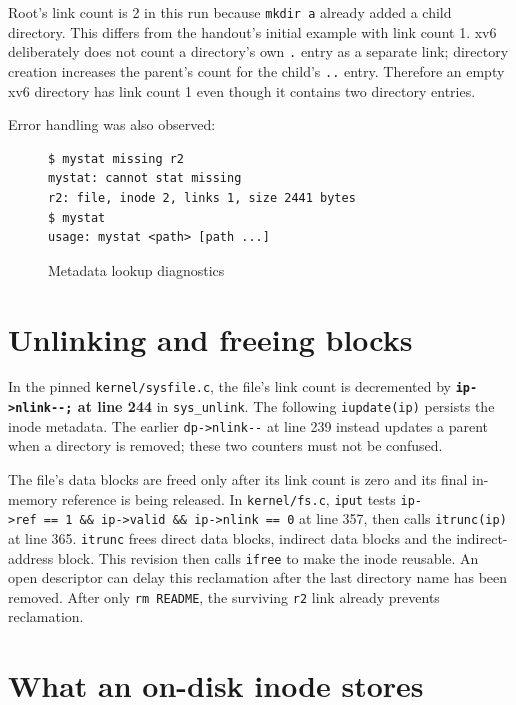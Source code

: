 \documentclass{../latex/utmreport}
\begin{document}
Root's link count is 2 in this run because \texttt{mkdir\ a} already
added a child directory. This differs from the handout's initial example
with link count 1. xv6 deliberately does not count a directory's own
\texttt{.} entry as a separate link; directory creation increases the
parent's count for the child's \texttt{..} entry. Therefore an empty xv6
directory has link count 1 even though it contains two directory
entries.

Error handling was also observed:

\begin{figure}[H]
\begin{lstlisting}
$ mystat missing r2
mystat: cannot stat missing
r2: file, inode 2, links 1, size 2441 bytes
$ mystat
usage: mystat <path> [path ...]
\end{lstlisting}
\caption{Metadata lookup diagnostics}
\end{figure}

\section{Unlinking and freeing
blocks}\label{unlinking-and-freeing-blocks}

In the pinned \texttt{kernel/sysfile.c}, the file's link count is
decremented by \textbf{\texttt{ip-\textgreater{}nlink-\/-;} at line 244}
in \texttt{sys\_unlink}. The following \texttt{iupdate(ip)} persists the
inode metadata. The earlier \texttt{dp-\textgreater{}nlink-\/-} at line
239 instead updates a parent when a directory is removed; these two
counters must not be confused.

The file's data blocks are freed only after its link count is zero and
its final in-memory reference is being released. In
\texttt{kernel/fs.c}, \texttt{iput} tests
\texttt{ip-\textgreater{}ref\ ==\ 1\ \&\&\ ip-\textgreater{}valid\ \&\&\ ip-\textgreater{}nlink\ ==\ 0}
at line 357, then calls \texttt{itrunc(ip)} at line 365. \texttt{itrunc}
frees direct data blocks, indirect data blocks and the indirect-address
block. This revision then calls \texttt{ifree} to make the inode
reusable. An open descriptor can delay this reclamation after the last
directory name has been removed. After only \texttt{rm\ README}, the
surviving \texttt{r2} link already prevents reclamation.

\section{What an on-disk inode
stores}\label{what-an-on-disk-inode-stores}
\end{document}
